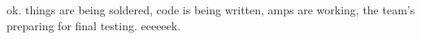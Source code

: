 ok. things are being soldered, code is being written, amps are working, the
team's preparing for final testing. eeeeeek.

